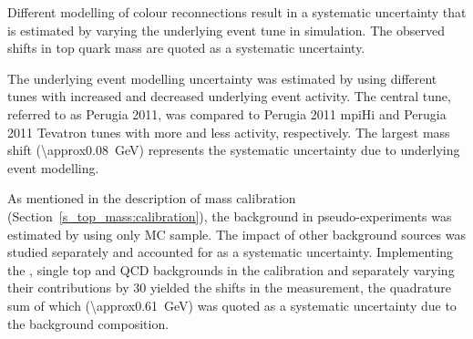 \begin{description}[wide=\parindent]


\item [Colour reconnection.] Different modelling of colour reconnections \autocite{colour_reconnection} result in a
systematic uncertainty that is estimated by varying the underlying event tune in simulation. The observed shifts in top
quark mass are quoted as a systematic uncertainty.

\item [Underlying event.] The underlying event \autocite{underlying_event} modelling uncertainty was estimated by using
different \PYTHIA tunes with increased and decreased underlying event activity. The central tune, referred to as Perugia
2011, was compared to Perugia 2011 mpiHi and Perugia 2011 Tevatron tunes \autocite{perugia_tunes} with more and less
activity, respectively. The largest mass shift (\SI{\approx0.08}{\GeV}) represents the systematic uncertainty due to
underlying event modelling.



\item [Background modelling.]
As mentioned in the description of mass calibration (Section~\ref{s_top_mass:calibration}), the background in
pseudo-experiments was estimated by using only \WpJets MC sample. The impact of other background sources was studied
separately and accounted for as a systematic uncertainty. Implementing the \ZpJets, single top and QCD backgrounds in
the calibration and separately varying their contributions by \SI{30}{\pc} yielded the shifts in the measurement, the
quadrature sum of which (\SI{\approx0.61}{\GeV}) was quoted as a systematic uncertainty due to the background
composition.


\end{description}
